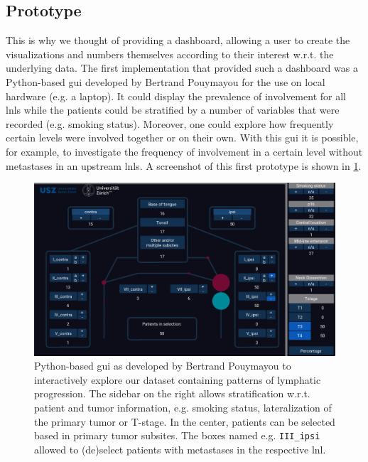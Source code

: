 \documentclass[\relativeRoot/main.tex]{subfiles}
\begin{document}
\subsection*{Prototype}
\label{subsec:lyprox:motivation:prototype}

This is why we thought of providing a dashboard, allowing a user to create the visualizations and numbers themselves according to their interest w.r.t. the underlying data. The first implementation that provided such a dashboard was a Python-based \gls{gui} developed by Bertrand Pouymayou for the use on local hardware (e.g. a laptop). It could display the prevalence of involvement for all \glspl{lnl} while the patients could be stratified by a number of variables that were recorded (e.g. smoking status). Moreover, one could explore how frequently certain levels were involved together or on their own. With this \gls{gui} it is possible, for example, to investigate the frequency of involvement in a certain level without metastases in an upstream \glspl{lnl}. A screenshot of this first prototype is shown in \cref{fig:lyprox:pouymayou_gui}.

\begin{figure}
    \centering
    \includegraphics[width=1.0\textwidth]{figures/pouymayou_gui.png}
    \caption[
        Prototype of a GUI to explore patterns of lymphatic progression
    ]{
        Python-based \gls{gui} as developed by Bertrand Pouymayou to interactively explore our dataset containing patterns of lymphatic progression. The sidebar on the right allows stratification w.r.t. patient and tumor information, e.g. smoking status, lateralization of the primary tumor or T-stage. In the center, patients can be selected based in primary tumor subsites. The boxes named e.g. \texttt{III\_ipsi} allowed to (de)select patients with metastases in the respective \gls{lnl}.
    }
    \label{fig:lyprox:pouymayou_gui}
\end{figure}
\end{document}
